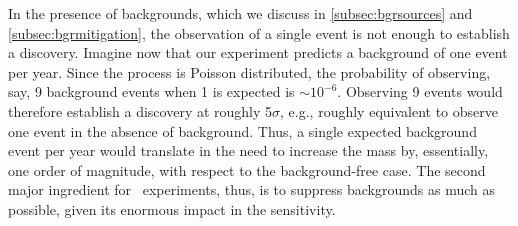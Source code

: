 
In the presence of backgrounds, which we discuss in \ref{subsec:bgrsources} and \ref{subsec:bgrmitigation},  the observation of a single event is not enough to establish a discovery. Imagine now that our  experiment predicts a background of one event per year. Since the process is Poisson distributed, the probability of observing, say, 9 background events when 1 is expected is $\sim 10^{-6}$. Observing 9 events would therefore establish a discovery at roughly 5$\sigma$, e.g., roughly equivalent to observe one event in the absence of background. Thus, a single expected background event per year would translate in the need to increase the mass by, essentially, one order of magnitude, with respect to the background-free case. The second major ingredient for \bbonu\ experiments, thus, is to suppress backgrounds as much as possible, given its enormous impact in the sensitivity. 
